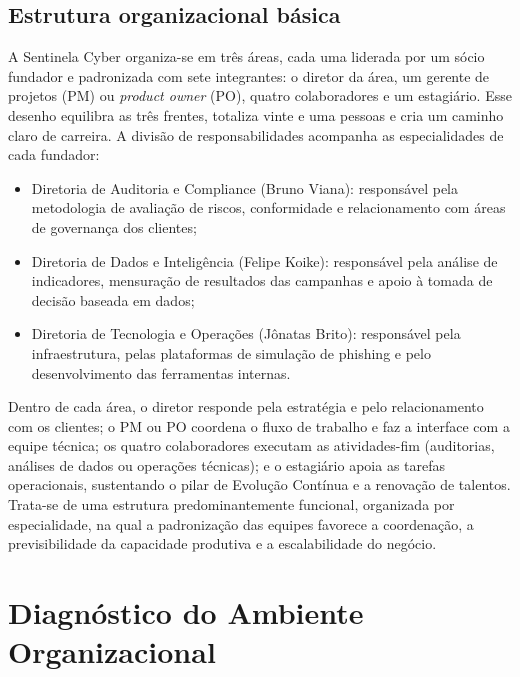 \documentclass[12pt,a4paper]{article}
\begin{document}
\subsection{Estrutura organizacional básica}

A Sentinela Cyber organiza-se em três áreas, cada uma liderada por um sócio
fundador e padronizada com sete integrantes: o diretor da área, um gerente de
projetos (PM) ou \textit{product owner} (PO), quatro colaboradores e um
estagiário. Esse desenho equilibra as três frentes, totaliza vinte e uma
pessoas e cria um caminho claro de carreira. A divisão de responsabilidades
acompanha as especialidades de cada fundador:

\begin{itemize}[noitemsep]
  \item Diretoria de Auditoria e Compliance (Bruno Viana): responsável pela
        metodologia de avaliação de riscos, conformidade e relacionamento com
        áreas de governança dos clientes;
  \item Diretoria de Dados e Inteligência (Felipe Koike): responsável pela
        análise de indicadores, mensuração de resultados das campanhas e apoio à
        tomada de decisão baseada em dados;
  \item Diretoria de Tecnologia e Operações (Jônatas Brito): responsável pela
        infraestrutura, pelas plataformas de simulação de phishing e pelo
        desenvolvimento das ferramentas internas.
\end{itemize}

Dentro de cada área, o diretor responde pela estratégia e pelo relacionamento
com os clientes; o PM ou PO coordena o fluxo de trabalho e faz a interface com
a equipe técnica; os quatro colaboradores executam as atividades-fim
(auditorias, análises de dados ou operações técnicas); e o estagiário apoia as
tarefas operacionais, sustentando o pilar de Evolução Contínua e a renovação de
talentos. Trata-se de uma estrutura predominantemente funcional, organizada por
especialidade, na qual a padronização das equipes favorece a coordenação, a
previsibilidade da capacidade produtiva e a escalabilidade do negócio.

\section{Diagnóstico do Ambiente Organizacional}
\end{document}
